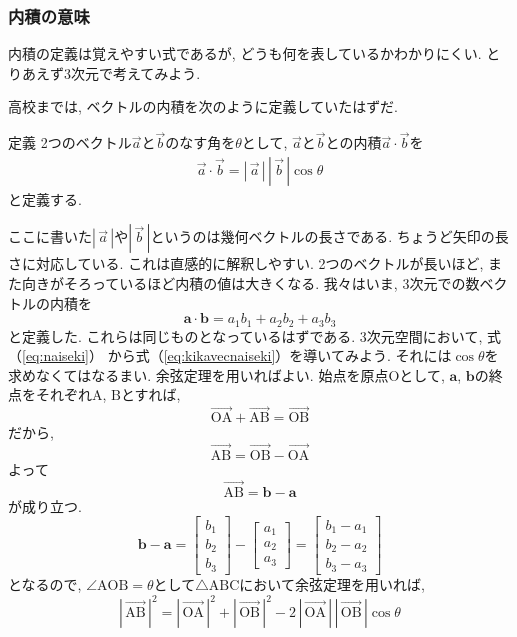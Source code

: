 \subsubsection{内積の意味}
内積の定義は覚えやすい式であるが, どうも何を表しているかわかりにくい. とりあえず3次元で考えてみよう. 

高校までは, ベクトルの内積を次のように定義していたはずだ. 
\begin{itembox}[l]{定義}
2つのベクトル$\vec{a}$と$\vec{b}$のなす角を$\theta$として, $\vec{a}$と$\vec{b}$との内積$\vec{a} \cdot \vec{b}$を
\begin{eqnarray}
\vec{a} \cdot \vec{b} = | \, \vec{a} \, | \, | \, \vec{b} \, | \cos \theta
\label{eq:kikavecnaiseki}
\end{eqnarray}
と定義する. 
\end{itembox}
ここに書いた$| \, \vec{a} \, |$や$| \, \vec{b} \, |$というのは幾何ベクトルの長さである. ちょうど矢印の長さに対応している. 
これは直感的に解釈しやすい. 2つのベクトルが長いほど, また向きがそろっているほど内積の値は大きくなる. 
我々はいま, 3次元での数ベクトルの内積を
$$
\bm{a} \cdot \bm{b} = a_1 b_1 + a_2 b_2 + a_3 b_3
$$
と定義した. これらは同じものとなっているはずである. 3次元空間において, 式（\ref{eq:naiseki}）
から式（\ref{eq:kikavecnaiseki}）を導いてみよう. 
それには$\cos \theta$を求めなくてはなるまい. 余弦定理を用いればよい. 
始点を原点$\mathrm{O}$として, $\bm{a}$, $\bm{b}$の終点をそれぞれ$\mathrm{A}$, $\mathrm{B}$とすれば, 
$$
\overrightarrow{\mathrm{OA}}+\overrightarrow{\mathrm{AB}}=\overrightarrow{\mathrm{OB}}
$$
だから, 
$$
\overrightarrow{\mathrm{AB}}=\overrightarrow{\mathrm{OB}} - \overrightarrow{\mathrm{OA}}
$$
よって
$$
\overrightarrow{\mathrm{AB}} = \bm{b} - \bm{a}
$$
が成り立つ. 
$$
\bm{b} - \bm{a} = \left[
 \begin{array}{c}
  b_1 \\
  b_2 \\
  b_3 
  \end{array}
\right]
-
\left[
\begin{array}{c}
 a_1 \\
 a_2 \\ 
 a_3
 \end{array}
 \right]
 =
 \left[
 \begin{array}{c}
  b_1 - a_1 \\
  b_2 - a_2 \\
  b_3 - a_3
  \end{array}
 \right]
$$
となるので, $\angle \mathrm{AOB} = \theta$として$\triangle \mathrm{ABC}$において余弦定理を用いれば, 
$$
| \, \overrightarrow{\mathrm{AB}} \, |^2 = 
| \, \overrightarrow{\mathrm{OA}} \, |^ 2 + | \, \overrightarrow{\mathrm{OB}} \, |^ 2
-2 \, | \, \overrightarrow{\mathrm{OA}} \, | \, | \, \overrightarrow{\mathrm{OB}} \, | \cos \theta
$$
